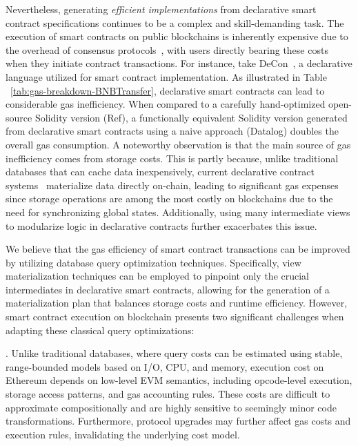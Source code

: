 Nevertheless, generating \emph{efficient implementations} from declarative smart contract specifications continues to be a complex and skill-demanding task. The execution of smart contracts on public blockchains is inherently expensive due to the overhead of consensus protocols~\cite{wood2014ethereum}, with users directly bearing these costs when they initiate contract transactions.
For instance, take DeCon~\cite{chen2022declarative}, a declarative language utilized for smart contract implementation. As illustrated in Table ~\ref{tab:gas-breakdown-BNBTransfer}, declarative smart contracts can lead to considerable gas inefficiency. When compared to a carefully hand-optimized open-source Solidity version ({\sf Ref}), a functionally equivalent Solidity version generated from declarative smart contracts using a naive approach ({\sf Datalog}) doubles the overall gas consumption. A noteworthy observation is that the main source of gas inefficiency comes from storage costs. This is partly because, unlike traditional databases that can cache data inexpensively, current declarative contract systems~\cite{chen2022declarative,dcv-icse24} materialize data directly on-chain, leading to significant gas expenses since storage operations are among the most costly on blockchains due to the need for synchronizing global states. Additionally, using many intermediate views to modularize logic in declarative contracts further exacerbates this issue.

We believe that the gas efficiency of smart contract transactions can be improved by utilizing database query optimization techniques.
Specifically, view materialization techniques can be employed to pinpoint only the crucial intermediates in declarative smart contracts, allowing for the generation of a materialization plan that balances storage costs and runtime efficiency. 
However, smart contract execution on blockchain presents two significant challenges when adapting these classical query optimizations:

.
Unlike traditional databases, where query costs can be estimated using stable, range-bounded models based on I/O, CPU, and memory, execution cost on Ethereum depends on low-level EVM semantics, including opcode-level execution, storage access patterns, and gas accounting rules. These costs are difficult to approximate compositionally and are highly sensitive to seemingly minor code transformations. Furthermore, protocol upgrades may further affect gas costs and execution rules, invalidating the underlying cost model.

